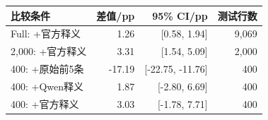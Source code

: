 \begin{tabular}{lrrr}
\toprule
比较条件 & 差值/pp & 95\% CI/pp & 测试行数 \\
\midrule
Full: +官方释义 & 1.26 & [0.58, 1.94] & 9,069 \\
2,000: +官方释义 & 3.31 & [1.54, 5.09] & 2,000 \\
400: +原始前5条 & -17.19 & [-22.75, -11.76] & 400 \\
400: +Qwen释义 & 1.87 & [-2.80, 6.69] & 400 \\
400: +官方释义 & 3.03 & [-1.78, 7.71] & 400 \\
\bottomrule
\end{tabular}
